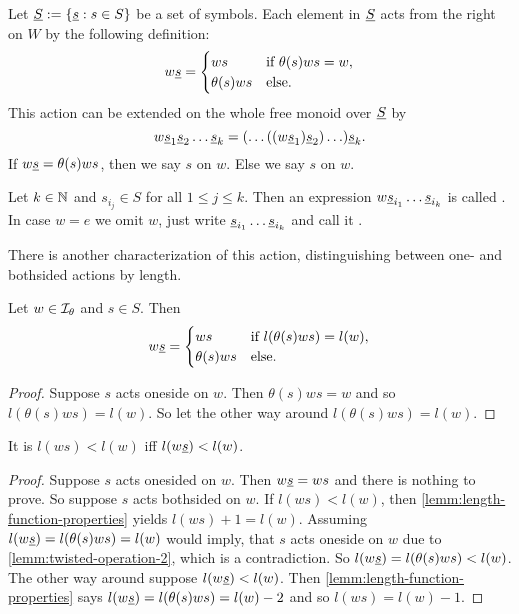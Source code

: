\begin{defi}
	Let $\underline{S} := \{ \underline{s} : s \in S \}$ be a set of symbols. Each element in $\underline{S}$ acts from the right on $W$ by the following definition:
	$$ w \underline{s} = \begin{cases}
		ws & \textrm{if } \theta(s)ws = w, \\
		\theta(s)ws & \textrm{else}. \\
	\end{cases} $$
	This action can be extended on the whole free monoid over $\underline{S}$ by
	$$ w \underline{s}_1 \underline{s}_2 \ldots \underline{s}_k = (\ldots ((w \underline{s}_1) \underline{s}_2) \ldots) \underline{s}_k. $$
	If $w \underline{s} = \theta(s)ws$, then we say $s$  on $w$. Else we say $s$  on $w$.
\end{defi}

\begin{defi}
	Let $k \in \mathbb{N}$ and $s_{i_j} \in S$ for all $1 \leq j \leq k$. Then an expression $w \underline{s}_{i_1} \ldots \underline{s}_{i_k}$ is called . In case $w = e$ we omit $w$, just write $\underline{s}_{i_1} \ldots \underline{s}_{i_k}$ and call it .
\end{defi}

There is another characterization of this action, distinguishing between one- and bothsided actions by length.

\begin{lemm}
	Let $w \in \mathcal{I}_{\theta}$ and $s \in S$. Then
	$$ w \underline{s} = \begin{cases}
		ws & \textrm{if } l(\theta(s)ws) = l(w), \\
		\theta(s)ws & \textrm{else}. \\
	\end{cases} $$

	\begin{proof}
		Suppose $s$ acts oneside on $w$. Then $\theta(s)ws = w$ and so $l(\theta(s)ws) = l(w)$. So let the other way around $l(\theta(s)ws) = l(w)$. \todo
	\end{proof}
\end{lemm}

\begin{lemm}
	It is $l(ws) < l(w)$ iff $l(w \underline{s}) < l(w)$.

	\begin{proof}
		Suppose $s$ acts onesided on $w$. Then $w \underline{s} = ws$ and there is nothing to prove. So suppose $s$ acts bothsided on $w$. If $l(ws) < l(w)$, then \ref{lemm:length-function-properties} yields $l(ws) + 1 = l(w)$. Assuming $l(w \underline{s}) = l(\theta(s)ws) = l(w)$ would imply, that $s$ acts oneside on $w$ due to \ref{lemm:twisted-operation-2}, which is a contradiction. So $l(w \underline{s}) = l(\theta(s)ws) < l(w)$. The other way around suppose $l(w \underline{s}) < l(w)$. Then \ref{lemm:length-function-properties} says $l(w \underline{s}) = l(\theta(s)ws) = l(w) - 2$ and so $l(ws) = l(w) - 1$.
	\end{proof}
\end{lemm}

